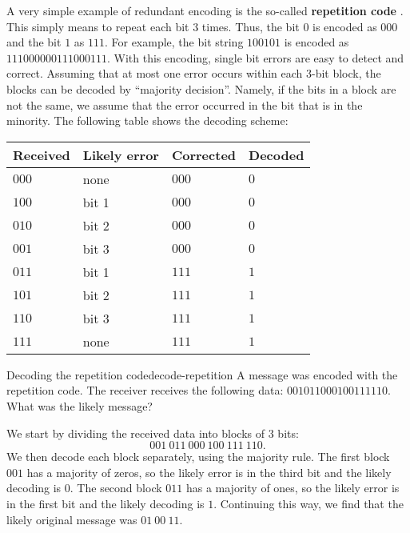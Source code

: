 A very simple example of redundant encoding is the so-called
\textbf{repetition code}%
%
. This simply means to repeat each bit 3
times. Thus, the bit $0$ is encoded as $000$ and the bit $1$ as
$111$. For example, the bit string $100101$ is encoded as
$111000000111000111$. With this encoding, single bit errors are easy
to detect and correct. Assuming that at most one error occurs within
each 3-bit block, the blocks can be decoded by ``majority
decision''. Namely, if the bits in a block are not the same, we assume
that the error occurred in the bit that is in the minority. The
following table shows the decoding scheme:
\begin{center}
  \begin{tabular}{|l|l|l|l|}
    \hline
    Received & Likely error & Corrected & Decoded \\\hline
    $000$    & none         & $000$     & $0$     \\
    $100$    & bit 1        & $000$     & $0$     \\
    $010$    & bit 2        & $000$     & $0$     \\
    $001$    & bit 3        & $000$     & $0$     \\
    $011$    & bit 1        & $111$     & $1$     \\
    $101$    & bit 2        & $111$     & $1$     \\
    $110$    & bit 3        & $111$     & $1$     \\
    $111$    & none         & $111$     & $1$     \\\hline
  \end{tabular}
\end{center}

\begin{example}{Decoding the repetition code}{decode-repetition}
  A message was encoded with the repetition code. The receiver
  receives the following data: $001011000100111110$. What was the
  likely message?
\end{example}

\begin{solution}
  We start by dividing the received data into blocks of 3 bits:
  \begin{equation*}
    001~011~000~100~111~110.
  \end{equation*}
  We then decode each block separately, using the majority rule.
  The first block $001$ has a majority of zeros, so the likely error is
  in the third bit and the likely decoding is $0$. The second block $011$
  has a majority of ones, so the likely error is in the first bit and
  the likely decoding is $1$. Continuing this way, we find that the
  likely original message was $01~00~11$.
\end{solution}

